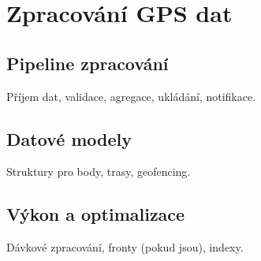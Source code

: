 \chapter{Zpracování GPS dat}
\label{chap:gps-data}

\section{Pipeline zpracování}
Příjem dat, validace, agregace, ukládání, notifikace.

\section{Datové modely}
Struktury pro body, trasy, geofencing.

\section{Výkon a optimalizace}
Dávkové zpracování, fronty (pokud jsou), indexy.
